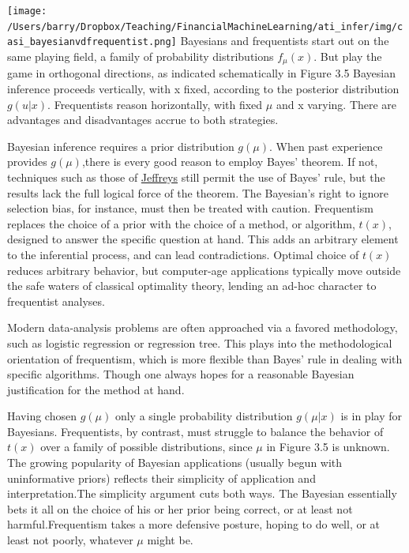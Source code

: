 \documentclass{article}
\begin{document}
\texttt{[image: /Users/barry/Dropbox/Teaching/FinancialMachineLearning/ati\_infer/img/casi\_bayesianvdfrequentist.png]}
Bayesians and frequentists start out on the same playing field, a family
of probability distributions \(f_{\mu}(x)\). But play the game in
orthogonal directions, as indicated schematically in Figure 3.5 Bayesian
inference proceeds vertically, with x fixed, according to the posterior
distribution \(g(u|x)\). Frequentists reason horizontally, with fixed
\(\mu\) and x varying. There are advantages and disadvantages accrue to
both strategies.

Bayesian inference requires a prior distribution \(g(\mu)\). When past
experience provides \(g(\mu)\),there is every good reason to employ
Bayes' theorem. If not, techniques such as those of
\href{https://en.wikipedia.org/wiki/Jeffreys_prior}{Jeffreys} still
permit the use of Bayes' rule, but the results lack the full logical
force of the theorem. The Bayesian's right to ignore selection bias, for
instance, must then be treated with caution. Frequentism replaces the
choice of a prior with the choice of a method, or algorithm, \(t(x)\),
designed to answer the specific question at hand. This adds an arbitrary
element to the inferential process, and can lead contradictions. Optimal
choice of \(t(x)\) reduces arbitrary behavior, but computer-age
applications typically move outside the safe waters of classical
optimality theory, lending an ad-hoc character to frequentist analyses.

Modern data-analysis problems are often approached via a favored
methodology, such as logistic regression or regression tree. This plays
into the methodological orientation of frequentism, which is more
flexible than Bayes' rule in dealing with specific algorithms. Though
one always hopes for a reasonable Bayesian justification for the method
at hand.

Having chosen \(g(\mu)\) only a single probability distribution
\(g(\mu|x)\) is in play for Bayesians. Frequentists, by contrast, must
struggle to balance the behavior of \(t(x)\) over a family of possible
distributions, since \(\mu\) in Figure 3.5 is unknown. The growing
popularity of Bayesian applications (usually begun with uninformative
priors) reflects their simplicity of application and interpretation.The
simplicity argument cuts both ways. The Bayesian essentially bets it all
on the choice of his or her prior being correct, or at least not
harmful.Frequentism takes a more defensive posture, hoping to do well,
or at least not poorly, whatever \(\mu\) might be.
\end{document}
